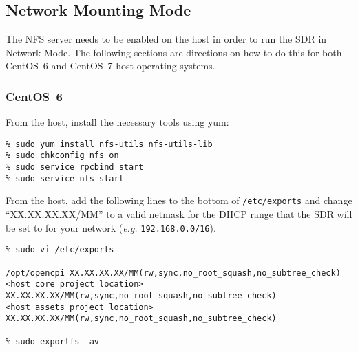 \iffalse
This file is protected by Copyright. Please refer to the COPYRIGHT file
distributed with this source distribution.

This file is part of OpenCPI <http://www.opencpi.org>

OpenCPI is free software: you can redistribute it and/or modify it under the
terms of the GNU Lesser General Public License as published by the Free Software
Foundation, either version 3 of the License, or (at your option) any later
version.

OpenCPI is distributed in the hope that it will be useful, but WITHOUT ANY
WARRANTY; without even the implied warranty of MERCHANTABILITY or FITNESS FOR A
PARTICULAR PURPOSE. See the GNU Lesser General Public License for more details.

You should have received a copy of the GNU Lesser General Public License along
with this program. If not, see <http://www.gnu.org/licenses/>.
\fi

\newlength{\savedparindentnfs}%
\setlength{\savedparindentnfs}{\parindent}%
\setlength{\parindent}{0pt} %
\providecommand{\forceindent}{\leavevmode{\parindent=1em\indent}}%

\subsection{Network Mounting Mode}
\label{sec:network_mode}
The NFS server needs to be enabled on the host in order to run the SDR in Network Mode. The following sections are directions on how to do this for both CentOS~6 and CentOS~7 host operating systems.
\subsubsection{CentOS~6}
From the host, install the necessary tools using yum:
\begin{verbatim}
% sudo yum install nfs-utils nfs-utils-lib
% sudo chkconfig nfs on
% sudo service rpcbind start
% sudo service nfs start
\end{verbatim}

From the host, add the following lines to the bottom of \texttt{/etc/exports} and change ``XX.XX.XX.XX/MM'' to a valid netmask for the DHCP range that the SDR will be set to for your network (\textit{e.g.} \texttt{192.168.0.0/16}).
\begin{verbatim}
% sudo vi /etc/exports

/opt/opencpi XX.XX.XX.XX/MM(rw,sync,no_root_squash,no_subtree_check)
<host core project location> XX.XX.XX.XX/MM(rw,sync,no_root_squash,no_subtree_check)
<host assets project location> XX.XX.XX.XX/MM(rw,sync,no_root_squash,no_subtree_check)

% sudo exportfs -av
\end{verbatim}

